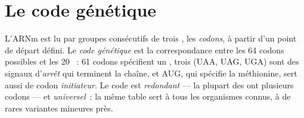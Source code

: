 \section{Le code génétique}

\begin{definition}\label{def:g11:gene-expression:code}
L'ARNm est lu par groupes consécutifs de trois , les
\emph{codons}, à partir d'un point de départ défini. Le
\emph{code génétique} est la correspondance entre
les 64 codons possibles et les 20 ~: 61 codons spécifient
un , trois (UAA, UAG, UGA) sont des signaux d'\emph{arrêt}
qui terminent la chaîne, et AUG, qui spécifie la méthionine, sert aussi
de codon \emph{initiateur}. Le code est \emph{redondant} --- la plupart
des  ont plusieurs codons --- et \emph{universel}~: la même
table sert à tous les organismes connus, à de rares variantes mineures
près.
\end{definition}

